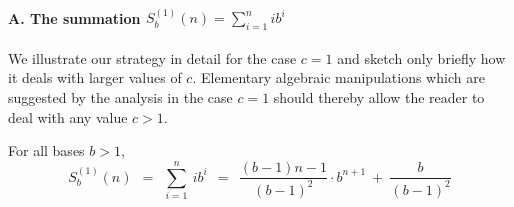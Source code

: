 \medskip

\paragraph{A. The summation $S^{(1)}_b(n) = \sum_{i=1}^n i b^i$}

We illustrate our strategy in detail for the case $c=1$ and sketch
only briefly how it deals with larger values of $c$.  Elementary
algebraic manipulations which are suggested by the analysis in the
case $c=1$ should thereby allow the reader to deal with any value $c > 1$.

\begin{prop}
\label{thm:sum-i2i}
For all bases $b > 1$,
\begin{equation}
\label{eq:sum-i2i}
S_b^{(1)}(n) \ \ = \ \
\sum_{i=1}^n \ i b^i
\ \ = \ \ 
\frac{(b-1)n -1}{(b-1)^2} \cdot  b^{n+1} \ + \ \frac{b}{(b-1)^2}
\end{equation}
\end{prop}

